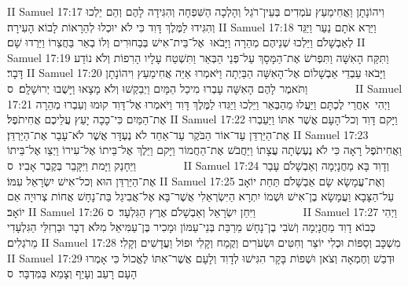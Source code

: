 II Samuel 17:17	וִיהוֹנָתָן וַאֲחִימַעַץ עֹמְדִים בְּעֵין־רֹגֵל וְהָלְכָה הַשִּׁפְחָה וְהִגִּידָה לָהֶם וְהֵם יֵלְכוּ וְהִגִּידוּ לַמֶּלֶךְ דָּוִד כִּי לֹא יוּכְלוּ לְהֵרָאוֹת לָבוֹא הָעִירָה׃
II Samuel 17:18	וַיַּרְא אֹתָם נַעַר וַיַּגֵּד לְאַבְשָׁלֹם וַיֵּלְכוּ שְׁנֵיהֶם מְהֵרָה וַיָּבֹאוּ  אֶל־בֵּית־אִישׁ בְּבַחוּרִים וְלוֹ בְאֵר בַּחֲצֵרוֹ וַיֵּרְדוּ שָׁם׃
II Samuel 17:19	וַתִּקַּח הָאִשָּׁה וַתִּפְרֹשׂ אֶת־הַמָּסָךְ עַל־פְּנֵי הַבְּאֵר וַתִּשְׁטַח עָלָיו הָרִפוֹת וְלֹא נוֹדַע דָּבָר׃
II Samuel 17:20	וַיָּבֹאוּ עַבְדֵי אַבְשָׁלוֹם אֶל־הָאִשָּׁה הַבַּיְתָה וַיֹּאמְרוּ אַיֵּה אֲחִימַעַץ וִיהוֹנָתָן וַתֹּאמֶר לָהֶם הָאִשָּׁה עָבְרוּ מִיכַל הַמָּיִם וַיְבַקְשׁוּ וְלֹא מָצָאוּ וַיָּשֻׁבוּ יְרוּשָׁלָ͏ִם׃ {ס}        
II Samuel 17:21	וַיְהִי  אַחֲרֵי לֶכְתָּם וַיַּעֲלוּ מֵהַבְּאֵר וַיֵּלְכוּ וַיַּגִּדוּ לַמֶּלֶךְ דָּוִד וַיֹּאמְרוּ אֶל־דָּוִד קוּמוּ וְעִבְרוּ מְהֵרָה אֶת־הַמַּיִם כִּי־כָכָה יָעַץ עֲלֵיכֶם אֲחִיתֹפֶל׃
II Samuel 17:22	וַיָּקם דָּוִד וְכל־הָעָם אֲשֶׁר אִתּוֹ וַיַּעַבְרוּ אֶת־הַיַּרְדֵּן עַד־אוֹר הַבֹּקֶר עַד־אַחַד לֹא נֶעְדָּר אֲשֶׁר לֹא־עָבַר אֶת־הַיַּרְדֵּן׃
II Samuel 17:23	וַאֲחִיתֹפֶל רָאָה כִּי לֹא נֶעֶשְׂתָה עֲצָתוֹ וַיַּחֲבֹשׁ אֶת־הַחֲמוֹר וַיָּקם וַיֵּלֶךְ אֶל־בֵּיתוֹ אֶל־עִירוֹ וַיְצַו אֶל־בֵּיתוֹ וַיֵּחָנַק וַיָּמת וַיִּקָּבֵר בְּקֶבֶר אָבִיו׃ {ס}        
II Samuel 17:24	וְדָוִד בָּא מַחֲנָיְמָה וְאַבְשָׁלֹם עָבַר אֶת־הַיַּרְדֵּן הוּא וְכל־אִישׁ יִשְׂרָאֵל עִמּוֹ׃
II Samuel 17:25	וְאֶת־עֲמָשָׂא שָׂם אַבְשָׁלֹם תַּחַת יוֹאָב עַל־הַצָּבָא וַעֲמָשָׂא בֶן־אִישׁ וּשְׁמוֹ יִתְרָא הַיִּשְׂרְאֵלִי אֲשֶׁר־בָּא אֶל־אֲבִיגַל בַּת־נָחָשׁ אֲחוֹת צְרוּיָה אֵם יוֹאָב׃
II Samuel 17:26	וַיִּחַן יִשְׂרָאֵל וְאַבְשָׁלֹם אֶרֶץ הַגִּלְעָד׃ {ס}        
II Samuel 17:27	וַיְהִי כְּבוֹא דָוִד מַחֲנָיְמָה וְשֹׁבִי בֶן־נָחָשׁ מֵרַבַּת בְּנֵי־עַמּוֹן וּמָכִיר בֶּן־עַמִּיאֵל מִלֹּא דְבָר וּבַרְזִלַּי הַגִּלְעָדִי מֵרֹגְלִים׃
II Samuel 17:28	מִשְׁכָּב וְסַפּוֹת וּכְלִי יוֹצֵר וְחִטִּים וּשְׂעֹרִים וְקֶמַח וְקָלִי וּפוֹל וַעֲדָשִׁים וְקָלִי׃
II Samuel 17:29	וּדְבַשׁ וְחֶמְאָה וְצֹאן וּשְׁפוֹת בָּקָר הִגִּישׁוּ לְדָוִד וְלָעָם אֲשֶׁר־אִתּוֹ לֶאֱכוֹל כִּי אָמְרוּ הָעָם רָעֵב וְעָיֵף וְצָמֵא בַּמִּדְבָּר׃ {ס}        
